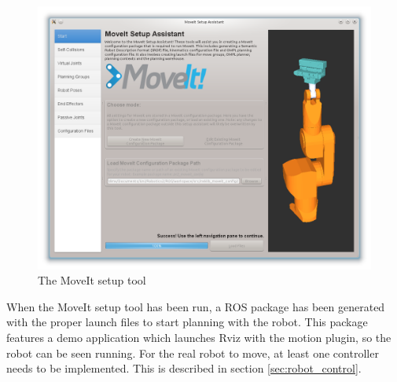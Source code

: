 
\begin{figure}[htb]
	\begin{center}
		\includegraphics[scale=0.4,trim=0 0 0 0]{graphics/05_robotics/moveit_setup_assistant.png}%
		\caption{The MoveIt setup tool}
		\label{fig:moveit_setup_assistant}
	\end{center}
\end{figure}

When the MoveIt setup tool has been run, a ROS package has been generated with the proper launch files to start planning with the robot. This package features a demo application which launches Rviz with the motion plugin, so the robot can be seen running. For the real robot to move, at least one controller needs to be implemented. This is described in section \ref{sec:robot_control}.


